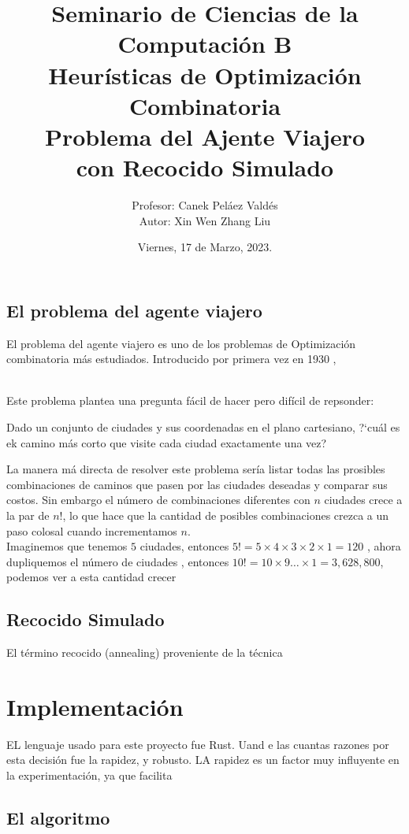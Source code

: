 \documentclass[a4paper]{article}
\title { \Large{Seminario de Ciencias de la Computaci\'on B}\protect\\
  \large{Heurísticas de Optimización Combinatoria}\protect\\
  \large{Problema del Ajente Viajero\\con Recocido Simulado}}
\date{\normalsize{Viernes, 17 de Marzo, 2023.}}
\author{\normalsize{Profesor: Canek Peláez Valdés}\protect\\
  \normalsize{Autor: Xin Wen Zhang Liu}}\vspace{0.2cm}
\begin{document}
\allowdisplaybreaks
\maketitle

\subsection*{El problema del agente viajero}
El problema del agente viajero es uno de los problemas de Optimización combinatoria m\'as estudiados. Introducido por primera vez en 1930 , 

\\Este problema plantea una pregunta f\'acil de hacer pero dif\'icil de repsonder:
\begin{center}
  Dado un conjunto de ciudades y sus coordenadas en el plano cartesiano, ?`cu\'al es ek camino m\'as corto que visite cada ciudad exactamente una vez?
\end{center}
La manera m\'a directa de resolver este problema ser\'ia listar todas las prosibles combinaciones de caminos que pasen por las ciudades deseadas y comparar sus costos. Sin embargo el n\'umero de combinaciones diferentes con $n$ ciudades crece a la par de  $n!$, lo que hace que la cantidad de posibles combinaciones crezca a un paso colosal cuando incrementamos $n$.\\

Imaginemos que tenemos $5$ ciudades, entonces $5! = 5\times 4\times 3 \times 2\times 1 = 120$ , ahora dupliquemos el n\'umero de ciudades , entonces $10! = 10 \times 9 \dots \times 1 = 3,628,800$, podemos ver a esta cantidad crecer 


\subsection*{Recocido Simulado}
El t\'ermino recocido (annealing) proveniente de la t\'ecnica 
\section*{Implementaci\'on}

EL lenguaje usado para este proyecto fue Rust. Uand e las cuantas razones por esta decisi\'on fue la rapidez, y robusto. LA rapidez es un factor muy influyente en la experimentaci\'on, ya que facilita 


\subsection*{El algoritmo}
\end{document}
